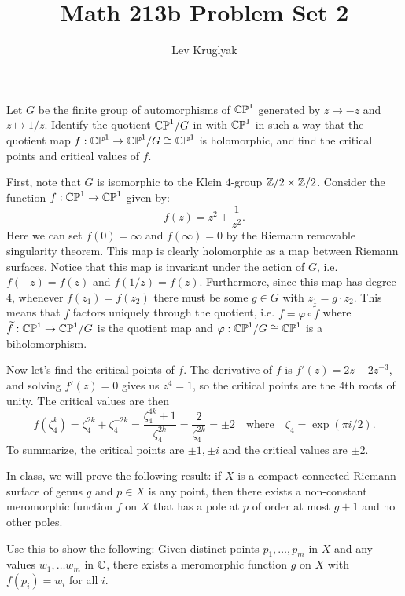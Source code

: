 \documentclass[expanded]{lkx_pset}
\title{Math 213b Problem Set 2}
\author{Lev Kruglyak}
\begin{document}
\maketitle

\begin{problem}{1}
Let $G$ be the finite group of automorphisms of $\mathbb{CP}^{1}$ generated by
$z\mapsto -z$ and $z\mapsto 1/z$. Identify the quotient $\mathbb{CP}^{1}/G$ in
with $\mathbb{CP}^{1}$ in such a way that the quotient map $f: \mathbb{CP}^{1}\to
	\mathbb{CP}^{1}/G \cong \mathbb{CP}^{1}$ is holomorphic, and find the critical points
and critical values of $f$.
\end{problem}

\begin{solution}
	First, note that $G$ is isomorphic to the Klein $4$-group $\mathbb{Z}/2\times \mathbb{Z}/2$.
	Consider the function $f : \mathbb{CP}^1 \to \mathbb{CP}^1$ given by:
	\[
		f(z) = z^2 + \frac{1}{z^2}.
	\]
	Here we can set $f(0)=\infty$ and $f(\infty)=0$ by the Riemann removable singularity theorem. This map is clearly holomorphic as a map between Riemann surfaces. Notice that this map is invariant under the action of $G$, i.e. $f(-z)=f(z)$ and $f(1/z)=f(z)$. Furthermore, since this map has degree $4$, whenever $f(z_1)=f(z_2)$ there must be some $g\in G$ with $z_1 = g\cdot z_2$. This means that $f$ factors uniquely through the quotient, i.e. $f = \varphi \circ \widetilde{f}$ where $\widetilde{f} : \mathbb{CP}^1 \to \mathbb{CP}^1/G$ is the quotient map and $\varphi : \mathbb{CP}^1/G \cong \mathbb{CP}^1$ is a biholomorphism.

	Now let's find the critical points of $f$. The derivative of $f$ is $f'(z) = 2z-2z^{-3}$, and solving $f'(z)=0$ gives us $z^4=1$, so the critical points are the $4$th roots of unity. The critical values are then
	\[
		f(\zeta_4^k) = \zeta_4^{2k} + \zeta_4^{-2k} = \frac{\zeta_4^{4k}+1}{\zeta_4^{2k}} = \frac{2}{\zeta_4^{2k}} = \pm 2\quad\textrm{where}\quad \zeta_4=\exp(\pi i/2).
	\]
	To summarize, the critical points are $\pm 1, \pm i$ and the critical values are $\pm 2$.
\end{solution}

\begin{problem}{2}
In class, we will prove the
following result: if $X$ is a compact connected Riemann surface of
genus $g$ and $p\in X$ is any point, then there exists a non-constant meromorphic
function $f$ on $X$ that has a pole at $p$ of order at most $g+1$ and
no other poles.
\end{problem}

\begin{parts}
	\begin{part}{}
		Use this to show the following: Given
		distinct points $p_{1},\dots, p_{m}$ in $X$ and any values
		$w_{1},\dots w_{m}$ in $\mathbb{C}$, there exists a meromorphic function $g$
		on $X$ with $f(p_{i})=w_{i}$ for all $i$.
	\end{part}
\end{parts}
\end{document}
